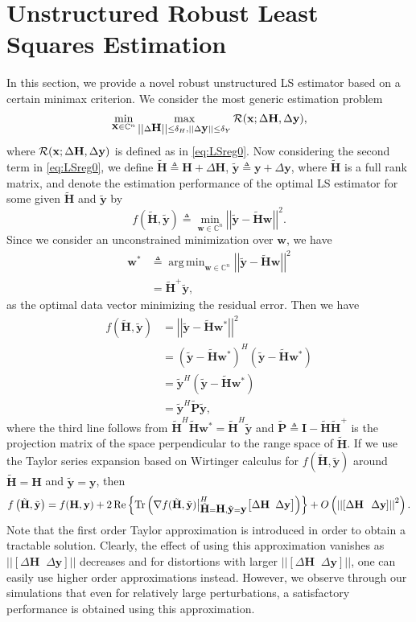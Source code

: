 \documentclass[review,sort&compress]{elsarticle}
\DeclareMathOperator*{\argmin}{arg\,min}
\renewcommand{\vec}[1]{\mbox{$\mathbf{#1}$}}
\newcommand{\norm}[1]{\left|\left|#1\right|\right|}
\newcommand{\defi}{\triangleq}
\newcommand{\tr}{\mathrm{Tr}}
\newcommand{\nn}{\nonumber}
\newcommand{\C}{\mathbb{C}}
\newcommand{\R}{{\cal R}}
\newcommand{\vH}{\vec{H}}
\newcommand{\vx}{\vec{x}}
\newcommand{\vy}{\vec{y}}
\newcommand{\dH}{\Delta\vH}
\newcommand{\dy}{\Delta\vy}
\newcommand{\tH}{\tilde{\vec{H}}}
\newcommand{\ty}{\tilde{\vec{y}}}
\newcommand{\tP}{\tilde{\vec{P}}}
\newcommand{\vI}{\vec{I}}
\newcommand{\vw}{\vec{w}}
\begin{document}
\section{Unstructured Robust Least Squares Estimation} \label{sec:urls}
In this section, we provide a novel robust unstructured LS estimator based on a certain minimax criterion. We consider the most generic estimation problem
\begin{equation}\label{eq:prudef1}
  \min_{\vx \in \C^n} \max_{\norm{\dH} \leq \delta_H,\norm{\dy} \leq \delta_Y} \R(\vx; \dH,\dy),
\end{equation}
where $\R(\vx; \dH,\dy)$ is defined as in \eqref{eq:LSreg0}. Now considering the second term in \eqref{eq:LSreg0}, we define $\tH \defi \vH + \dH$, $\ty \defi \vy+\dy$, where $\tH$ is a full rank matrix, and denote the estimation performance of the optimal LS estimator for some given $\tH$ and $\ty$ by
\[
f(\tH, \ty) \defi \min_{\vw \in \C^n}{\norm{\ty - \tH \vw}}^2.
\]
Since we consider an unconstrained minimization over $\vw$, we have \cite{sayedbook}
\begin{align}
  \vw^* & \defi \argmin_{\vw \in \C^n}{\norm{\ty - \tH \vw}}^2 \nn\\
        & = \tH^+ \ty,
\end{align}
as the optimal data vector minimizing the residual error. Then we have
\begin{align}
  f\left(\tH, \ty \right) & = \norm{\ty - \tH \vw^*}^2 \nn\\ & = (\ty - \tH \vw^*)^H (\ty - \tH \vw^*) \nn\\
              & = \ty^H (\ty - \tH \vw^*) \nn\\
              & = \ty^H \tP \ty, \nn
\end{align}
where the third line follows from $\tH^H \tH \vw^* = \tH^H \ty$ \cite{sayedbook} and $\tP \defi \vI-\tH\tH^+$ is the projection matrix of the space perpendicular to the range space of $\tH$. If we use the Taylor series expansion based on Wirtinger calculus \cite{graham} for $f\left(\tH, \ty \right)$ around $\tH = \vH$ and $\ty = \vy$, then
\begin{equation}\label{eq:1stTaylorApp}
  f\left(\tH, \ty \right) = f(\vH,\vy) + 2\operatorname{Re} \left\{ \tr\left( \nabla f(\tH, \ty)\big\vert_{\tH=\vH, \ty = \vy}^H \big[\dH \;\; \dy\big] \right) \right\} + O\left( \norm{\left[\dH \hspace{0.1in} \dy \right]}^2 \right).
\end{equation}
Note that the first order Taylor approximation is introduced in order to obtain a tractable solution. Clearly, the effect of using this approximation vanishes as $\norm{[\dH \;\; \dy ]}$ decreases and for distortions with larger $\norm{[\dH \;\; \dy ]}$, one can easily use higher order approximations instead. However, we observe through our simulations that even for relatively large perturbations, a satisfactory performance is obtained using this approximation.
\end{document}
